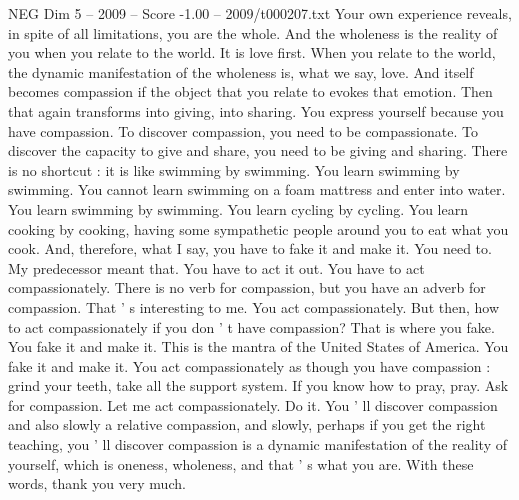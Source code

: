 \begin{textsample}{NEG Dim 5 – 2009 – Score -1.00 – 2009/t000207.txt}
Your own experience reveals, in spite of all limitations, you are the whole.
And the wholeness is the reality of you when you relate to the world.
It is love first.
When you relate to the world, the dynamic manifestation of the wholeness is, what we say, love.
And itself becomes compassion if the object that you relate to evokes that emotion.
Then that again transforms into giving, into sharing.
You express yourself because you have compassion.
To discover compassion, you need to be compassionate.
To discover the capacity to give and share, you need to be giving and sharing.
There is no shortcut : it is like swimming by swimming.
You learn swimming by swimming.
You cannot learn swimming on a foam mattress and enter into water.
You learn swimming by swimming.
You learn cycling by cycling.
You learn cooking by cooking, having some sympathetic people around you to eat what you cook.
And, therefore, what I say, you have to fake it and make it.
You need to.
My predecessor meant that.
You have to act it out.
You have to act compassionately.
There is no verb for compassion, but you have an adverb for compassion.
That ' s interesting to me.
You act compassionately.
But then, how to act compassionately if you don ' t have compassion?
That is where you fake.
You fake it and make it.
This is the mantra of the United States of America.
You fake it and make it.
You act compassionately as though you have compassion : grind your teeth, take all the support system.
If you know how to pray, pray.
Ask for compassion.
Let me act compassionately.
Do it.
You ' ll discover compassion and also slowly a relative compassion, and slowly, perhaps if you get the right teaching, you ' ll discover compassion is a dynamic manifestation of the reality of yourself, which is oneness, wholeness, and that ' s what you are.
With these words, thank you very much.

\end{textsample}
